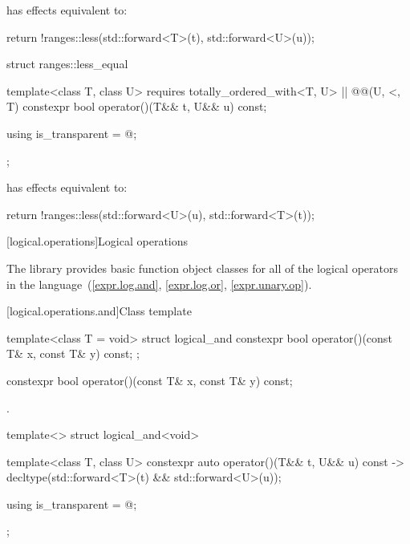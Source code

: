 \begin{itemdescr}
\pnum
{} has effects equivalent to:
\begin{codeblock}
return !ranges::less{}(std::forward<T>(t), std::forward<U>(u));
\end{codeblock}
\end{itemdescr}

%
\begin{itemdecl}
struct ranges::less_equal {
  template<class T, class U>
    requires totally_ordered_with<T, U> || @@(U, <, T)
  constexpr bool operator()(T&& t, U&& u) const;

  using is_transparent = @\unspecnc@;
};
\end{itemdecl}

\begin{itemdescr}
\pnum
{} has effects equivalent to:
\begin{codeblock}
return !ranges::less{}(std::forward<U>(u), std::forward<T>(t));
\end{codeblock}
\end{itemdescr}

[logical.operations]{Logical operations}

\pnum
The library provides basic function object classes for all of the logical
operators in the language~(\ref{expr.log.and}, \ref{expr.log.or}, \ref{expr.unary.op}).

[logical.operations.and]{Class template }

%
\begin{itemdecl}
template<class T = void> struct logical_and {
  constexpr bool operator()(const T& x, const T& y) const;
};
\end{itemdecl}

%
\begin{itemdecl}
constexpr bool operator()(const T& x, const T& y) const;
\end{itemdecl}

\begin{itemdescr}
\pnum
\returns
{}.
\end{itemdescr}

%
\begin{itemdecl}
template<> struct logical_and<void> {
  template<class T, class U> constexpr auto operator()(T&& t, U&& u) const
    -> decltype(std::forward<T>(t) && std::forward<U>(u));

  using is_transparent = @\unspec@;
};
\end{itemdecl}

